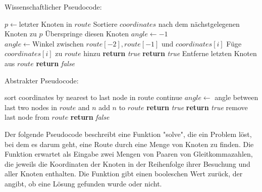 \documentclass[a4paper,10pt,ngerman]{scrartcl}
\begin{document}
    Wissenschaftlicher Pseudocode:
\begin{algorithmic}
\State $p \gets \text{letzter Knoten in }route$
\State Sortiere $coordinates$ nach dem nächstgelegenen Knoten zu $p$
\EndIf
{}
\State Überspringe diesen Knoten
\EndIf
\State $angle \gets -1$
\State $angle \gets \text{Winkel zwischen } route[-2], route[-1] \text{ und } coordinates[i]$
\EndIf
{}
\State Füge $coordinates[i]$ zu $route$ hinzu
\State \textbf{return} \textit{true}
\EndIf
{}
\State \textbf{return} \textit{true}
\Else
\State Entferne letzten Knoten aus $route$
\EndIf
\EndIf
\EndFor
\State \textbf{return} \textit{false}
\EndFunction
\end{algorithmic}

Abstrakter Pseudocode:
\begin{algorithmic}
\State sort coordinates by nearest to last node in route
\EndIf
{}
\State continue
\EndIf
\State $angle \gets$ angle between last two nodes in $route$ and $n$
\State add $n$ to $route$
\State \textbf{return} \textit{true}
\EndIf
{}
\State \textbf{return} \textit{true}
\Else
\State remove last node from $route$
\EndIf
\EndIf
\EndFor
\State \textbf{return} \textit{false}
\EndFunction
\end{algorithmic}

Der folgende Pseudocode beschreibt eine Funktion "solve", die ein Problem löst, bei dem es darum geht, eine Route durch eine Menge von Knoten zu finden. Die Funktion erwartet als Eingabe zwei Mengen von Paaren von Gleitkommazahlen, die jeweils die Koordinaten der Knoten in der Reihenfolge ihrer Besuchung und aller Knoten enthalten. Die Funktion gibt einen booleschen Wert zurück, der angibt, ob eine Lösung gefunden wurde oder nicht.
\end{document}
